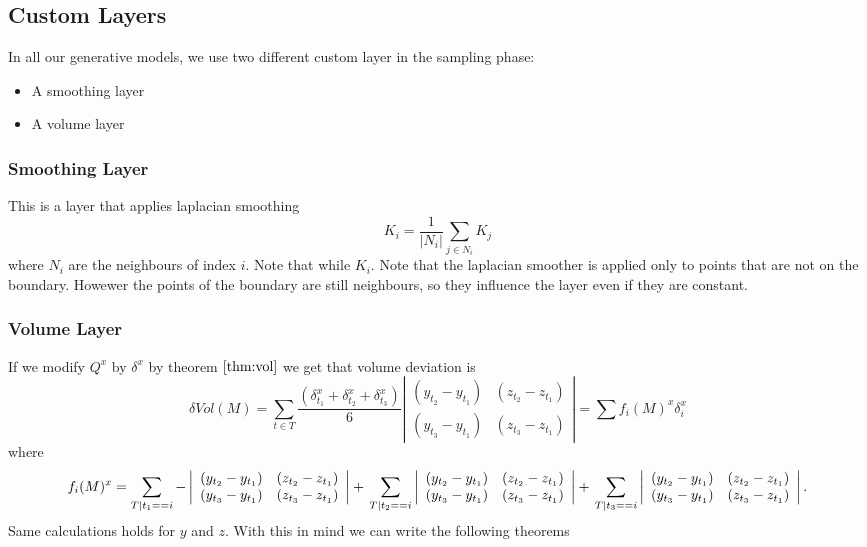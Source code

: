 \documentclass{article}
\begin{document}
\subsection{Custom Layers}
In all our generative models, we use two different custom layer in the sampling phase:
\begin{itemize}
\item A smoothing layer
\item A volume layer
\end{itemize}
\subsubsection{Smoothing Layer}
This is a layer that applies laplacian smoothing $$K_{i}=\frac{1}{|N_{i}|}\sum_{j \in N_{i}} K_{j}$$ where $N_{i}$ are the neighbours of index $i$. Note that while $K_{i}$. Note that the laplacian smoother is applied only to points that are not on the boundary. Howewer the points of the boundary are still neighbours, so they influence the layer even if they are constant. 

\subsubsection{Volume Layer}
If we modify $Q^{x}$ by $\delta^{x}$ by theorem $\ref{thm:vol}$ we get that volume deviation is  $$\delta Vol(M)=\sum_{t\in T} \frac{(\delta^{x}_{t_{1}}+\delta^{x}_{t_{2}}+\delta^{x}_{t_{3}})}{6}\left|\begin{array}{cl}
\left(y_{t_{2}}-y_{t_{1}}\right) & \left(z_{t_{2}}-z_{t_{1}}\right) \\
\left(y_{t_{3}}-y_{t_{1}}\right) & \left(z_{t_{3}}-z_{t_{1}}\right)
\end{array}\right|=\sum f_{i}(M)^{x}\delta_{i}^{x}$$ where $$f_{i}(M)^{x}=\sum_{T|t_{1}==i} -\left|\begin{array}{cl}
\left(y_{t_{2}}-y_{t_{1}}\right) & \left(z_{t_{2}}-z_{t_{1}}\right) \\
\left(y_{t_{3}}-y_{t_{1}}\right) & \left(z_{t_{3}}-z_{t_{1}}\right)
\end{array}\right|+\\ \sum_{T|t_{2}==i} \left|\begin{array}{cl}
\left(y_{t_{2}}-y_{t_{1}}\right) & \left(z_{t_{2}}-z_{t_{1}}\right) \\
\left(y_{t_{3}}-y_{t_{1}}\right) & \left(z_{t_{3}}-z_{t_{1}}\right)
\end{array}\right|+ \\  \sum_{T|t_{3}==i} \left|\begin{array}{cl}
\left(y_{t_{2}}-y_{t_{1}}\right) & \left(z_{t_{2}}-z_{t_{1}}\right) \\
\left(y_{t_{3}}-y_{t_{1}}\right) & \left(z_{t_{3}}-z_{t_{1}}\right)
\end{array}\right|.$$ Same calculations holds for $y$ and $z$.
With this in mind we can write the following theorems
\end{document}
